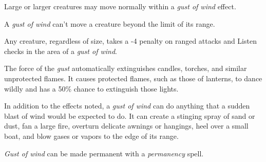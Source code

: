 \documentclass{article}
\begin{document}
Large or larger creatures may move normally within a \textit{gust of wind }effect.

A \textit{gust of wind }can't move a creature beyond the limit of its range.

Any creature, regardless of size, takes a -4 penalty on ranged attacks and Listen 
checks in the area of a \textit{gust of wind}.

The force of the \textit{gust }automatically extinguishes candles, torches, and 
similar unprotected flames. It causes protected flames, such as those of lanterns, 
to dance wildly and has a 50\% chance to extinguish those lights.

In addition to the effects noted, a \textit{gust of wind }can do anything that 
a sudden blast of wind would be expected to do. It can create a stinging spray 
of sand or dust, fan a large fire, overturn delicate awnings or hangings, heel 
over a small boat, and blow gases or vapors to the edge of its range.

\textit{Gust of wind }can be made permanent with a \textit{permanency }spell.

\newpage
\end{document}

